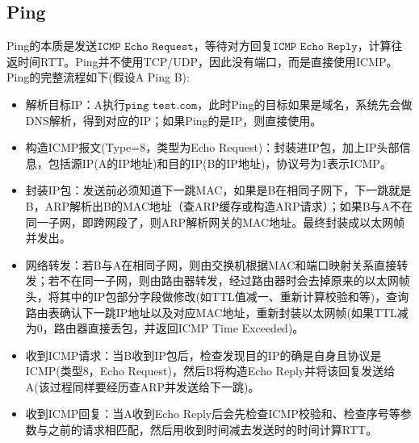 \subsection{Ping}
Ping的本质是发送$\texttt{ICMP Echo Request}$，等待对方回复$\texttt{ICMP Echo Reply}$，计算往返时间RTT。Ping并不使用TCP/UDP，因此没有端口，而是直接使用ICMP。
Ping的完整流程如下(假设A Ping B):
\begin{itemize}
    \item 解析目标IP：A执行$\texttt{ping test.com}$，此时Ping的目标如果是域名，系统先会做DNS解析，得到对应的IP；如果Ping的是IP，则直接使用。
    \item 构造ICMP报文(Type=8，类型为Echo Request)：封装进IP包，加上IP头部信息，包括源IP(A的IP地址)和目的IP(B的IP地址)，协议号为1表示ICMP。
    \item 封装IP包：发送前必须知道下一跳MAC，如果是B在相同子网下，下一跳就是B，ARP解析出B的MAC地址（查ARP缓存或构造ARP请求）；如果B与A不在同一子网，即跨网段了，则ARP解析网关的MAC地址。最终封装成以太网帧并发出。
    \item 网络转发：若B与A在相同子网，则由交换机根据MAC和端口映射关系直接转发；若不在同一子网，则由路由器转发，经过路由器时会去掉原来的以太网帧头，将其中的IP包部分字段做修改(如TTL值减一、重新计算校验和等)，查询路由表确认下一跳IP地址以及对应MAC地址，重新封装以太网帧(如果TTL减为0，路由器直接丢包，并返回ICMP Time Exceeded)。
    \item 收到ICMP请求：当B收到IP包后，检查发现目的IP的确是自身且协议是ICMP(类型8，Echo Request)，然后B将构造Echo Reply并将该回复发送给A(该过程同样要经历查ARP并发送给下一跳)。
    \item 收到ICMP回复：当A收到Echo Reply后会先检查ICMP校验和、检查序号等参数与之前的请求相匹配，然后用收到时间减去发送时的时间计算RTT。
\end{itemize}


